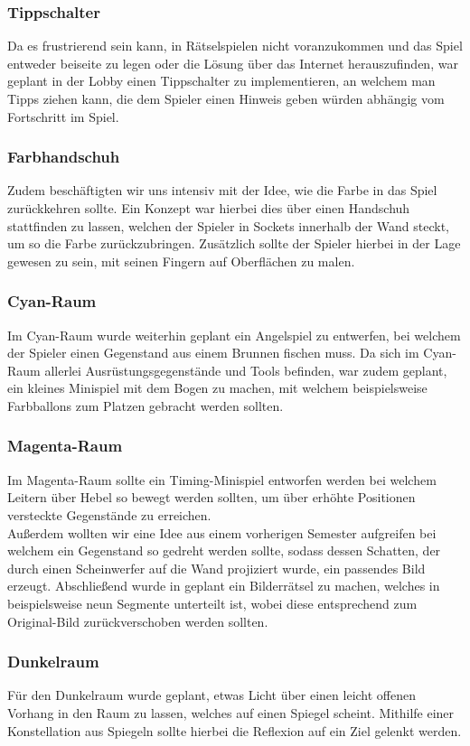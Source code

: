 \subsubsection{Tippschalter}
Da es frustrierend sein kann, in Rätselspielen nicht voranzukommen und das Spiel entweder beiseite zu legen oder die Lösung über das Internet herauszufinden, war geplant in der Lobby einen Tippschalter zu implementieren, an welchem man Tipps ziehen kann, die dem Spieler einen Hinweis geben würden abhängig vom Fortschritt im Spiel.
\subsubsection{Farbhandschuh}
Zudem beschäftigten wir uns intensiv mit der Idee, wie die Farbe in das Spiel zurückkehren sollte. Ein Konzept war hierbei dies über einen Handschuh stattfinden zu lassen, welchen der Spieler in Sockets innerhalb der Wand steckt, um so die Farbe zurückzubringen. Zusätzlich sollte der Spieler hierbei in der Lage gewesen zu sein, mit seinen Fingern auf Oberflächen zu malen.
\subsubsection{Cyan-Raum}
Im Cyan-Raum wurde weiterhin geplant ein Angelspiel zu entwerfen, bei welchem der Spieler einen Gegenstand aus einem Brunnen fischen muss. 
Da sich im Cyan-Raum allerlei Ausrüstungsgegenstände und Tools befinden, war zudem geplant, ein kleines Minispiel mit dem Bogen zu machen, mit welchem beispielsweise Farbballons zum Platzen gebracht werden sollten.
\subsubsection{Magenta-Raum}
Im Magenta-Raum sollte ein Timing-Minispiel entworfen werden bei welchem Leitern über Hebel so bewegt werden sollten, um über erhöhte Positionen versteckte Gegenstände zu erreichen.\\
Außerdem wollten wir eine Idee aus einem vorherigen Semester aufgreifen bei welchem ein Gegenstand so gedreht werden sollte, sodass dessen Schatten, der durch einen Scheinwerfer auf die Wand projiziert wurde, ein passendes Bild erzeugt. Abschließend wurde in geplant ein Bilderrätsel zu machen, welches in beispielsweise neun Segmente unterteilt ist, wobei diese entsprechend zum Original-Bild zurückverschoben werden sollten. 
\subsubsection{Dunkelraum}
Für den Dunkelraum wurde geplant, etwas Licht über einen leicht offenen Vorhang in den Raum zu lassen, welches auf einen Spiegel scheint. Mithilfe einer Konstellation aus Spiegeln sollte hierbei die Reflexion auf ein Ziel gelenkt werden.


